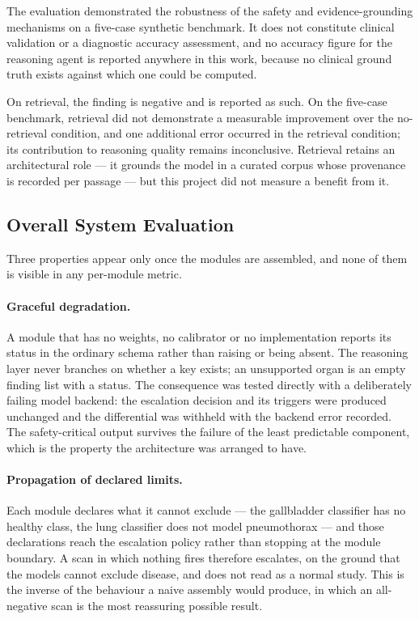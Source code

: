 The evaluation demonstrated the robustness of the safety and evidence-grounding mechanisms on
a five-case synthetic benchmark. It does not constitute clinical validation or a diagnostic
accuracy assessment, and no accuracy figure for the reasoning agent is reported anywhere in
this work, because no clinical ground truth exists against which one could be computed.

On retrieval, the finding is negative and is reported as such. On the five-case benchmark,
retrieval did not demonstrate a measurable improvement over the no-retrieval condition, and
one additional error occurred in the retrieval condition; its contribution to reasoning
quality remains inconclusive. Retrieval retains an architectural role --- it grounds the
model in a curated corpus whose provenance is recorded per passage --- but this project did
not measure a benefit from it.

\subsection{Overall System Evaluation}
\label{subsec:results-system}

Three properties appear only once the modules are assembled, and none of them is visible in
any per-module metric.

\paragraph{Graceful degradation.} A module that has no weights, no calibrator or no
implementation reports its status in the ordinary schema rather than raising or being absent.
The reasoning layer never branches on whether a key exists; an unsupported organ is an empty
finding list with a status. The consequence was tested directly with a deliberately failing
model backend: the escalation decision and its triggers were produced unchanged and the
differential was withheld with the backend error recorded. The safety-critical output survives
the failure of the least predictable component, which is the property the architecture was
arranged to have.

\paragraph{Propagation of declared limits.} Each module declares what it cannot exclude --- the
gallbladder classifier has no healthy class, the lung classifier does not model pneumothorax
--- and those declarations reach the escalation policy rather than stopping at the module
boundary. A scan in which nothing fires therefore escalates, on the ground that the models
cannot exclude disease, and does not read as a normal study. This is the inverse of the
behaviour a naive assembly would produce, in which an all-negative scan is the most reassuring
possible result.

